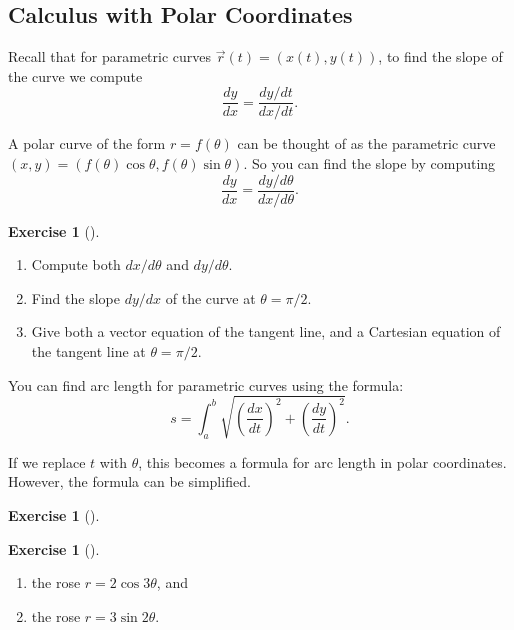 \documentclass[10pt,]{book}
\theoremstyle{plain}
\theoremstyle{definition}
\theoremstyle{definition}
\theoremstyle{definition}
\theoremstyle{definition}
\newtheorem{exploration}[project]{Exercise}
\theoremstyle{definition}
\numberwithin{equation}{section}
\begin{document}
\subsection[{Calculus with Polar Coordinates}]{Calculus with Polar Coordinates}\label{subsection-21}
Recall that for parametric curves \(\vec r(t) = (x(t),y(t))\), to find the slope of the curve we compute%
\begin{equation*}
\frac{dy}{dx}=\frac{dy/dt}{dx/dt}.
\end{equation*}
%
\par
A polar curve of the form \(r=f(\theta)\) can be thought of as the parametric curve \((x,y) = (f(\theta)\cos\theta,f(\theta)\sin\theta)\). So you can find the slope by computing%
\begin{equation*}
\frac{dy}{dx}=\frac{dy/d\theta}{dx/d\theta}.
\end{equation*}
%
\begin{exploration}[]\label{exploration-95}
\leavevmode%
\begin{enumerate}[font=\bfseries,label=(\alph*),ref=\alph*]
\item\label{task-155} Compute both \(dx/d\theta\) and \(dy/d\theta\).%
\item\label{task-156} Find the slope \(dy/dx\) of the curve at \(\theta=\pi/2\).%
\item\label{task-157} Give both a vector equation of the tangent line, and a Cartesian equation of the tangent line at \(\theta=\pi/2\).%
\end{enumerate}
\end{exploration}
You can find arc length for parametric curves using the formula:%
\begin{equation*}
s=\int_a^b\sqrt{\left(\frac{dx}{dt}\right)^2+\left(\frac{dy}{dt}\right)^2}.
\end{equation*}
%
\par
If we replace \(t\) with \(\theta\), this becomes a formula for arc length in polar coordinates. However, the formula can be simplified.%
\begin{exploration}[]\label{exploration-96}
\end{exploration}
\begin{exploration}[]\label{exploration-97}
\leavevmode%
\begin{enumerate}[font=\bfseries,label=(\alph*),ref=\alph*]
\item\label{task-158} the rose \(r=2\cos 3\theta\), and%
\item\label{task-159} the rose \(r=3\sin 2\theta\).%
\end{enumerate}
\end{exploration}
\typeout{************************************************}
\typeout{************************************************}
\end{document}
